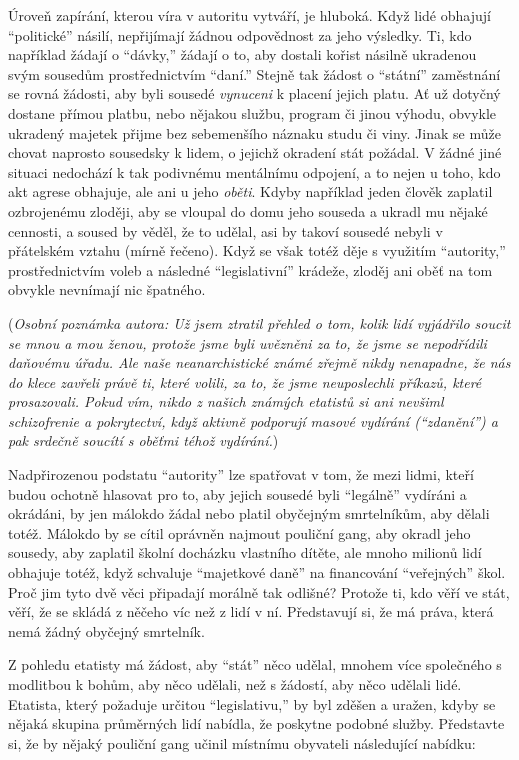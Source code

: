 \documentclass{book}
\begin{document}
Úroveň zapírání, kterou víra v autoritu vytváří, je hluboká. Když lidé obhajují \enquote{politické} násilí, nepřijímají žádnou odpovědnost za jeho výsledky. Ti, kdo například žádají o \enquote{dávky,} žádají o to, aby dostali kořist násilně ukradenou svým sousedům prostřednictvím \enquote{daní.} Stejně tak žádost o \enquote{státní} zaměstnání se rovná žádosti, aby byli sousedé \emph{vynuceni} k placení jejich platu. Ať už dotyčný dostane přímou platbu, nebo nějakou službu, program či jinou výhodu, obvykle ukradený majetek přijme bez sebemenšího náznaku studu či viny. Jinak se může chovat naprosto sousedsky k lidem, o jejichž okradení stát požádal. V žádné jiné situaci nedochází k tak podivnému mentálnímu odpojení, a to nejen u toho, kdo akt agrese obhajuje, ale ani u jeho \emph{oběti}. Kdyby například jeden člověk zaplatil ozbrojenému zloději, aby se vloupal do domu jeho souseda a ukradl mu nějaké cennosti, a soused by věděl, že to udělal, asi by takoví sousedé nebyli v přátelském vztahu (mírně řečeno). Když se však totéž děje s využitím \enquote{autority,} prostřednictvím voleb a následné \enquote{legislativní} krádeže, zloděj ani oběť na tom obvykle nevnímají nic špatného.

(\emph{Osobní poznámka autora: Už jsem ztratil přehled o tom, kolik lidí vyjádřilo soucit se mnou a mou ženou, protože jsme byli uvězněni za to, že jsme se nepodřídili daňovému úřadu. Ale naše neanarchistické známé zřejmě nikdy nenapadne, že nás do klece zavřeli právě ti, které volili, za to, že jsme neuposlechli příkazů, které prosazovali. Pokud vím, nikdo z našich známých etatistů si ani nevšiml schizofrenie a pokrytectví, když aktivně podporují masové vydírání (\enquote{zdanění}) a pak srdečně soucítí s oběťmi téhož vydírání.})

Nadpřirozenou podstatu \enquote{autority} lze spatřovat v tom, že mezi lidmi, kteří budou ochotně hlasovat pro to, aby jejich sousedé byli \enquote{legálně} vydíráni a okrádáni, by jen málokdo žádal nebo platil obyčejným smrtelníkům, aby dělali totéž. Málokdo by se cítil oprávněn najmout pouliční gang, aby okradl jeho sousedy, aby zaplatil školní docházku vlastního dítěte, ale mnoho milionů lidí obhajuje totéž, když schvaluje \enquote{majetkové daně} na financování \enquote{veřejných} škol. Proč jim tyto dvě věci připadají morálně tak odlišné? Protože ti, kdo věří ve stát, věří, že se skládá z něčeho víc než z lidí v ní. Představují si, že má práva, která nemá žádný obyčejný smrtelník.

Z pohledu etatisty má žádost, aby \enquote{stát} něco udělal, mnohem více společného s modlitbou k bohům, aby něco udělali, než s žádostí, aby něco udělali lidé. Etatista, který požaduje určitou \enquote{legislativu,} by byl zděšen a uražen, kdyby se nějaká skupina průměrných lidí nabídla, že poskytne podobné služby. Představte si, že by nějaký pouliční gang učinil místnímu obyvateli následující nabídku:
\end{document}
